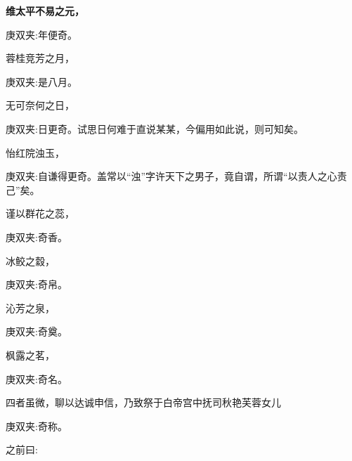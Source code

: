 \begin{qute2sp}
    \bfseries
    维太平不易之元，\begin{note}庚双夹:年便奇。\end{note}蓉桂竞芳之月，\begin{note}庚双夹:是八月。\end{note}无可奈何之日，\begin{note}庚双夹:日更奇。试思日何难于直说某某，今偏用如此说，则可知矣。\end{note}怡红院浊玉，\begin{note}庚双夹:自谦得更奇。盖常以“浊”字许天下之男子，竟自谓，所谓“以责人之心责己”矣。\end{note}谨以群花之蕊，\begin{note}庚双夹:奇香。\end{note}冰鲛之縠，\begin{note}庚双夹:奇帛。\end{note}沁芳之泉，\begin{note}庚双夹:奇奠。\end{note}枫露之茗，\begin{note}庚双夹:奇名。\end{note}四者虽微，聊以达诚申信，乃致祭于白帝宫中抚司秋艳芙蓉女儿\begin{note}庚双夹:奇称。\end{note}之前曰:




\end{qute2sp}
